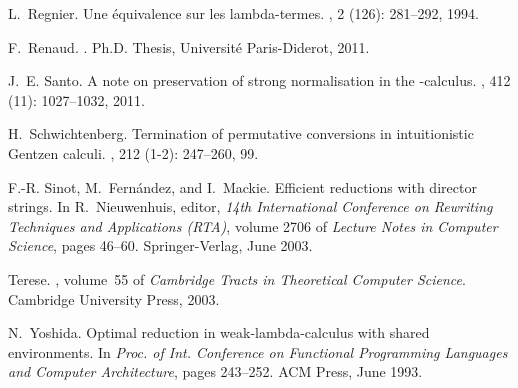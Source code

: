 \documentclass{LMCS}
\renewcommand{\>}{\rightarrow}
\begin{document}
\begin{thebibliography}{10}
L.~Regnier.
\newblock Une \'equivalence sur les lambda-termes.
, 2 (126):
  281--292, 1994.

F.~Renaud.
.
\newblock Ph.{D}. {T}hesis, {U}niversit\'e {P}aris-{D}iderot, 2011.

J.~E. Santo.
\newblock A note on preservation of strong normalisation in the -calculus.
, 412 (11): 1027--1032,
  2011.

H.~Schwichtenberg.
\newblock Termination of permutative conversions in intuitionistic {G}entzen
  calculi.
, 212 (1-2):
  247--260, 99.

F.-R. Sinot, M.~Fern{\'a}ndez, and I.~Mackie.
\newblock Efficient reductions with director strings.
\newblock In R.~Nieuwenhuis, editor, {\em 14th International Conference on
  Rewriting Techniques and Applications (RTA)}, volume 2706 of {\em Lecture
  Notes in Computer Science}, pages 46--60. Springer-Verlag, June 2003.

Terese.
, volume~55 of {\em Cambridge Tracts in
  Theoretical Computer Science}.
\newblock Cambridge University Press, 2003.

N.~Yoshida.
\newblock Optimal reduction in weak-lambda-calculus with shared environments.
\newblock In {\em Proc. of Int. Conference on Functional Programming Languages
  and Computer Architecture}, pages 243--252. ACM Press, June 1993.

\end{thebibliography}
\end{document}
